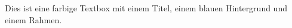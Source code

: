 \documentclass{article}
\begin{document}
\begin{tcolorbox}[colback=blue!5!white, colframe=blue!75!black, title=Beispiel-Titel, width=\textwidth]
Dies ist eine farbige Textbox mit einem Titel, einem blauen Hintergrund und einem Rahmen.
\end{tcolorbox}
\end{document}
